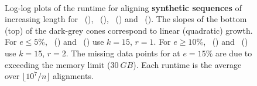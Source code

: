 \begin{figure}[H]
  \centering
  \\

  \caption[Runtime scaling with sequence length (multiple error rates)]{Log-log
    plots of the runtime for aligning \textbf{synthetic sequences} of increasing
    length for \astarpa \sh~(\SH), \astarpa \csh~(\CSH), \edlib~(\edlibsymbol)
    and \wfa~(\wfasymbol). The slopes of the bottom (top) of the dark-grey cones
    correspond to linear (quadratic) growth. For $e{\leq} 5\%$,
    \SH~(\shsymbolsq) and \CSH~(\cshsymbolsq) use $k{=}15$, $r{=}1$. For $e{\ge}
    10\%$, \SH~(\shsymbol) and \CSH~(\cshsymbol) use $k{=}15$, $r{=}2$. The
    missing data points for \SH at $e{=}15\%$ are due to exceeding the memory
    limit ($\qty{30}{GB}$). Each runtime is the average over $\lfloor 10^7 / n
    \rfloor$ alignments.}
  \label{GLOBALfig:scaling-n}
\end{figure}
